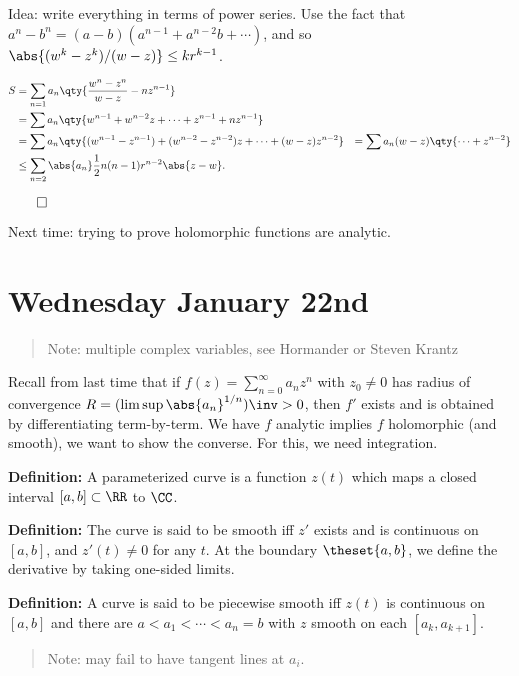 Idea: write everything in terms of power series. Use the fact that
\(a^n - b^n = (a-b)(a^{n-1} + a^{n-2}b + \cdots)\), and so
\(\abs{(w^k-z^k)/(w-z)} \leq k r^{k-1}\).

\begin{align*}
S 
&= \sum_{n=1} a_n \qty{ \frac{w^n - z^n}{w-z} - n z^{n-1}  } \\
&= \sum a_n \qty{ w^{n-1} + w^{n-2}z + \cdots + z^{n-1} + nz^{n-1} } \\
&=  \sum a_n \qty{ (w^{n-1} - z^{n-1}) + (w^{n-2} - z^{n-2})z + \cdots + (w-z) z^{n-2} }
&= \sum a_n (w-z) \qty{ \cdots + z^{n-2} }\\
&\leq \sum_{n=2} \abs{a_n} \frac 1 2 n(n-1) r^{n-2} \abs{z-w}
.\end{align*}

\(\qed\)

Next time: trying to prove holomorphic functions are analytic.

\hypertarget{wednesday-january-22nd}{%
\section{Wednesday January 22nd}\label{wednesday-january-22nd}}

\begin{quote}
Note: multiple complex variables, see Hormander or Steven Krantz
\end{quote}

Recall from last time that if \(f(z) = \sum_{n=0}^\infty a_n z^n\) with
\(z_0 \neq 0\) has radius of convergence
\(R = (\limsup \abs{a_n}^{1/n})\inv > 0\), then \(f'\) exists and is
obtained by differentiating term-by-term. We have \(f\) analytic implies
\(f\) holomorphic (and smooth), we want to show the converse. For this,
we need integration.

\textbf{Definition:} A parameterized curve is a function \(z(t)\) which
maps a closed interval \([a, b] \subset \RR\) to \(\CC\).

\textbf{Definition:} The curve is said to be smooth iff \(z'\) exists
and is continuous on \([a,b]\), and \(z'(t) \neq 0\) for any \(t\). At
the boundary \(\theset{a, b}\), we define the derivative by taking
one-sided limits.

\textbf{Definition:} A curve is said to be piecewise smooth iff \(z(t)\)
is continuous on \([a, b]\) and there are \(a < a_1 < \cdots < a_n = b\)
with \(z\) smooth on each \([a_k, a_{k+1}]\).

\begin{quote}
Note: may fail to have tangent lines at \(a_i\).
\end{quote}

